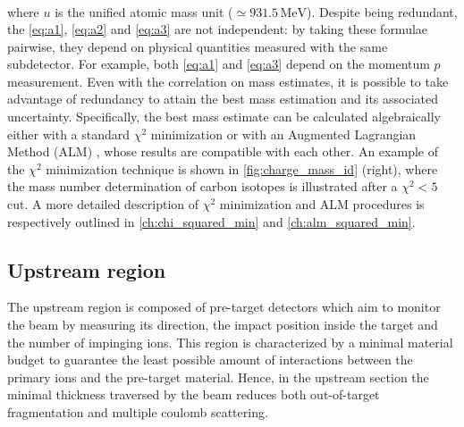 \begin{itemize}
\begin{subequations}
\begin{align}
		\end{align}
	\end{subequations}
	where $u$ is the unified atomic mass unit ($\simeq931.5\,\mathrm{MeV}$). Despite being redundant, the \autoref{eq:a1}, \autoref{eq:a2} and \autoref{eq:a3} are not independent: by taking these formulae pairwise, they depend on physical quantities measured with the same subdetector. For example, both \autoref{eq:a1} and \autoref{eq:a3} depend on the momentum $p$ measurement. Even with the correlation on mass estimates, it is possible to take advantage of redundancy to attain the best mass estimation and its associated uncertainty. Specifically, the best mass estimate can be calculated algebraically either with a standard $\chi^2$ minimization or with an Augmented Lagrangian Method (ALM) \cite{Cho_2016}, whose results are compatible with each other. An example of the $\chi^2$ minimization technique is shown in \autoref{fig:charge_mass_id} (right), where the mass number determination of carbon isotopes is illustrated after a $\chi^2<5$ cut. A more detailed description of $\chi^2$ minimization and ALM procedures is respectively outlined in \autoref{ch:chi_squared_min} and \autoref{ch:alm_squared_min}.
\end{itemize}
\subsection{Upstream region}\label{ssec:upstream_reg}
The upstream region is composed of pre-target detectors which aim to monitor the beam by measuring its direction, the impact position inside the target and the number of impinging ions. This region is characterized by a minimal material budget to guarantee the least possible amount of interactions between the primary ions and the pre-target material. Hence, in the upstream section the minimal thickness traversed by the beam reduces both out-of-target fragmentation and multiple coulomb scattering.
